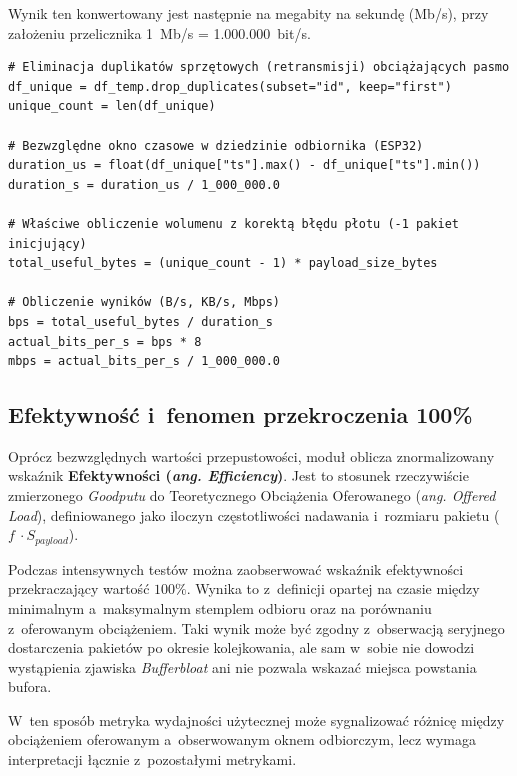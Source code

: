 Wynik ten konwertowany jest następnie na megabity na sekundę (Mb/s), przy założeniu przelicznika 1~Mb/s = 1.000.000~bit/s.

\begin{listing}[htbp]
    \caption{Wektorowe odrzucanie retransmisji i~rygorystyczne obliczanie przepływności z~poprawką \textit{Fencepost} (\texttt{goodput.py}) \cite{espy_nexus_python_host}.}
    \label{lst:goodput_pandas}
    \begin{verbatim}
# Eliminacja duplikatów sprzętowych (retransmisji) obciążających pasmo
df_unique = df_temp.drop_duplicates(subset="id", keep="first")
unique_count = len(df_unique)

# Bezwzględne okno czasowe w dziedzinie odbiornika (ESP32)
duration_us = float(df_unique["ts"].max() - df_unique["ts"].min())
duration_s = duration_us / 1_000_000.0

# Właściwe obliczenie wolumenu z korektą błędu płotu (-1 pakiet inicjujący)
total_useful_bytes = (unique_count - 1) * payload_size_bytes

# Obliczenie wyników (B/s, KB/s, Mbps)
bps = total_useful_bytes / duration_s
actual_bits_per_s = bps * 8
mbps = actual_bits_per_s / 1_000_000.0
\end{verbatim}
\end{listing}

\subsection{Efektywność i~fenomen przekroczenia 100\%}

Oprócz bezwzględnych wartości przepustowości, moduł oblicza znormalizowany wskaźnik \textbf{Efektywności (\textit{ang. Efficiency})}.
Jest to stosunek rzeczywiście zmierzonego \textit{Goodputu} do Teoretycznego Obciążenia Oferowanego (\textit{ang. Offered Load}), definiowanego jako iloczyn częstotliwości nadawania i~rozmiaru pakietu ($f~\cdot S_{payload}$).

Podczas intensywnych testów można zaobserwować wskaźnik efektywności przekraczający wartość $100\%$.
Wynika to z~definicji opartej na czasie między minimalnym a~maksymalnym stemplem odbioru oraz na porównaniu z~oferowanym obciążeniem.
Taki wynik może być zgodny z~obserwacją seryjnego dostarczenia pakietów po okresie kolejkowania, ale sam w~sobie nie dowodzi wystąpienia zjawiska \textit{Bufferbloat} ani nie pozwala wskazać miejsca powstania bufora.

W~ten sposób metryka wydajności użytecznej może sygnalizować różnicę między obciążeniem oferowanym a~obserwowanym oknem odbiorczym, lecz wymaga interpretacji łącznie z~pozostałymi metrykami.

